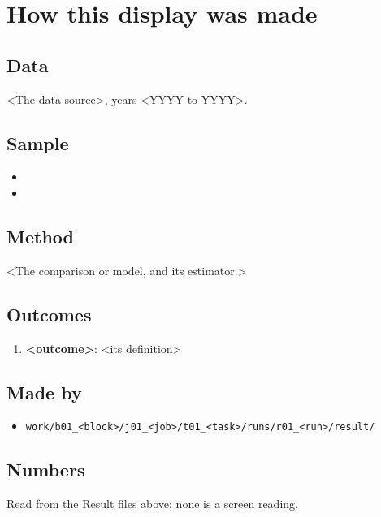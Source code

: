 \documentclass[12pt]{article}
\begin{document}
\makeatletter\renewcommand{\fps@figure}{H}\renewcommand{\fps@table}{H}\makeatother
\renewcommand{\figurename}{Figure}\renewcommand{\tablename}{Table}\renewcommand{\thefigure}{1}\renewcommand{\thetable}{1}

\clearpage
\section*{How this display was made}
\subsection*{Data}
<The data source>, years <YYYY to YYYY>.

\subsection*{Sample}
\begin{itemize}\item <who is in it>
\item <how they were chosen>
\end{itemize}
\subsection*{Method}
<The comparison or model, and its estimator.>

\subsection*{Outcomes}
\begin{enumerate}\item \textbf{<outcome>}: <its definition>
\end{enumerate}
\subsection*{Made by}
\begin{itemize}\item \texttt{work/b01\_<block>/j01\_<job>/t01\_<task>/runs/r01\_<run>/result/}
\end{itemize}
\subsection*{Numbers}
Read from the Result files above; none is a screen reading.
\end{document}
